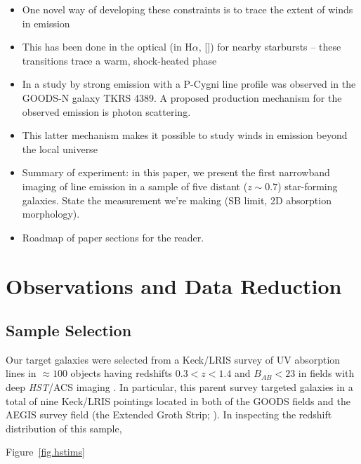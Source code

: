 \documentclass[twocolumn]{aastex6}
\begin{document}
\begin{itemize}
\item One novel way of developing these constraints is to trace the extent of winds in emission

\item This has been done in the optical (in H$\alpha$, []) for nearby starbursts -- these transitions trace a warm, shock-heated phase

\item In a study by \cite{Rubin_2011} strong  emission with a P-Cygni line profile was observed in the GOODS-N galaxy TKRS 4389. A proposed production mechanism for the observed  emission is photon scattering.

\item This latter mechanism makes it possible to study winds in emission beyond the local universe

\item Summary of experiment: in this paper, we present the first narrowband imaging of  line emission in a sample of five distant ($z\sim0.7$) star-forming galaxies.  State the measurement we're making (SB limit, 2D absorption morphology).

\item Roadmap of paper sections for the reader.

\end{itemize}


\section{Observations and Data Reduction}

\subsection{Sample Selection}

Our target galaxies were selected from a Keck/LRIS survey of UV absorption lines in $\approx 100$ objects having redshifts $0.3< z < 1.4$ and $B_{AB}< 23$ in fields with deep \emph{HST}/ACS imaging \citep{Rubin_2014}.  In particular, this parent survey targeted galaxies in a total of nine Keck/LRIS pointings located in both of the GOODS fields \citep{Giavalisco2004} and the AEGIS survey field (the Extended Groth Strip; \cite{Davis2007}).  In inspecting the redshift distribution of this sample, 


Figure~\ref{fig.hstims}
\end{document}
